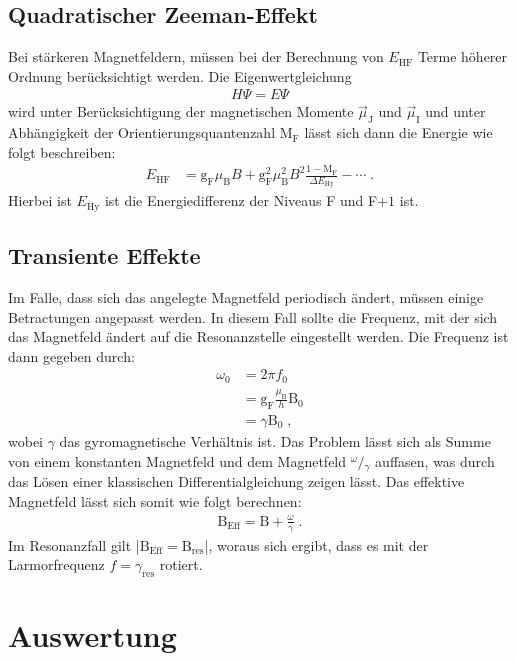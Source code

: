 \subsection{Quadratischer Zeeman-Effekt}
Bei stärkeren Magnetfeldern, müssen bei der Berechnung von $E_{\text{HF}}$ Terme höherer Ordnung berücksichtigt werden.
Die Eigenwertgleichung
\begin{align*}
    H \Psi = E \Psi
\end{align*}
wird unter Berücksichtigung der magnetischen Momente $\vec{\mu}_{\text{J}}$ und $\vec{\mu}_{\text{I}}$ und unter Abhängigkeit der Orientierungsquantenzahl $\text{M}_{\text{F}}$ lässt sich dann die Energie wie folgt beschreiben:
\begin{align}
  \label{eq_qZeeman}
    E_{\text{HF}} &= \text{g}_{\text{F}} \mu_{\text{B}} B+ \text{g}_{\text{F}}^2 \mu_{\text{B}}^2 B^2 \frac{1- \text{M}_{\text{F}}}{\Delta E_{\text{Hy}}}- \cdots  \; .
\end{align}
Hierbei ist $E_{\text{Hy}}$ ist die Energiedifferenz der Niveaus F und F$+1$ ist.

\subsection{Transiente Effekte}
Im Falle, dass sich das angelegte Magnetfeld periodisch ändert, müssen einige Betractungen angepasst werden.
In diesem Fall sollte die Frequenz, mit der sich das Magnetfeld ändert auf die Resonanzstelle eingestellt werden.
Die Frequenz ist dann gegeben durch:
\begin{align*}
    \omega_0 &= 2\pi f_0 \\
    &= \text{g}_{\text{F}} \frac{\mu_{\text{B}}}{h} \text{B}_0 \\
    &= \gamma \text{B}_0 \; ,
\end{align*}
wobei $\gamma$ das gyromagnetische Verhältnis ist.
Das Problem lässt sich als Summe von einem konstanten Magnetfeld und dem
Magnetfeld ${}^\omega\!/\!_\gamma$ auffasen, was durch das Lösen einer klassischen Differentialgleichung zeigen lässt.
Das effektive Magnetfeld lässt sich somit wie folgt berechnen:
\begin{align*}
    \text{B}_{\text{Eff}} = \text{B} + \frac{\omega}{\gamma} \; .
\end{align*}
Im Resonanzfall gilt |$\text{B}_{\text{Eff}} = \text{B}_{\text{res}}$|, woraus sich ergibt, dass es mit der Larmorfrequenz $f= \gamma_{\text{res}}$
rotiert.

\section{Auswertung}

